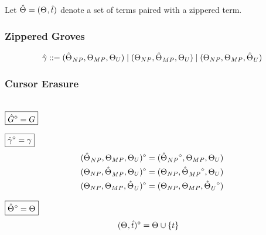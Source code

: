 Let $\Z{\Set} = (\Set, \Z{t})$ denote a set of terms paired with a zippered term.


\subsubsection{Zippered Groves}

\begin{gather*}
  \arraycolsep=0pt
  \begin{array}{lll}
    \Z{\gamma} & {}::={} &
      (\Z{\Set}_{NP}, \Set[MP], \Set[U])
      \mid (\Set[NP], \Z{\Set}_{MP}, \Set[U])
      \mid (\Set[NP], \Set[MP], \Z{\Set}_U)
  \end{array}
\end{gather*}




\subsubsection{Cursor Erasure}
\hspace*{\fill} \\


\noindent $\boxed{\erase{\Z{G}} = G}$

\noindent $\boxed{\erase{\Z{\gamma}} = \gamma}$
%
\begin{align*}
  \erase{(\Z{\Set}_{NP}, \Set[MP], \Set[U])} &= (\erase{\Z{\Set}_{NP}}, \Set[MP], \Set[U]) \\
  \erase{(\Set[NP], \Z{\Set}_{MP}, \Set[U])} &= (\Set[NP], \erase{\Z{\Set}_{MP}}, \Set[U]) \\
  \erase{(\Set[NP], \Set[MP], \Z{\Set}_U)} &= (\Set[NP], \Set[MP], \erase{\Z{\Set}_U})
\end{align*}

\noindent $\boxed{\erase{\Z{\Set}} = \Set}$
%
\begin{align*}
  \erase{(\Set, \Z{t})} &= \Set \cup \SetOf{t}
\end{align*}

